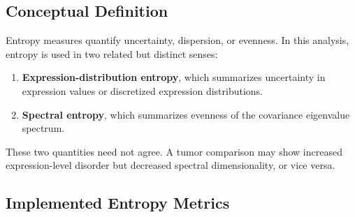 \documentclass[
  letterpaper,
  DIV=11,
  numbers=noendperiod,
  openany,
  oneside]{scrreprt}
\providecommand{\tightlist}{%
  \setlength{\itemsep}{0pt}\setlength{\parskip}{0pt}}
\begin{document}
\subsection{Conceptual Definition}\label{conceptual-definition-1}

Entropy measures quantify uncertainty, dispersion, or evenness. In this
analysis, entropy is used in two related but distinct senses:

\begin{enumerate}
\def\labelenumi{\arabic{enumi}.}
\tightlist
\item
  \textbf{Expression-distribution entropy}, which summarizes uncertainty
  in expression values or discretized expression distributions.
\item
  \textbf{Spectral entropy}, which summarizes evenness of the covariance
  eigenvalue spectrum.
\end{enumerate}

These two quantities need not agree. A tumor comparison may show
increased expression-level disorder but decreased spectral
dimensionality, or vice versa.

\subsection{Implemented Entropy
Metrics}\label{implemented-entropy-metrics}
\end{document}

